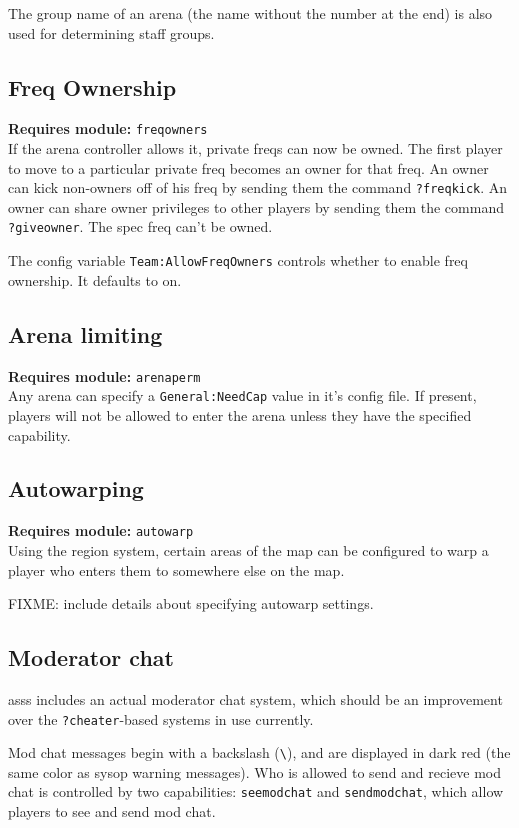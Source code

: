 \documentclass{article}
\newcommand{\asss}{asss}
\newcommand{\requiremod}[1]{\noindent\textbf{Requires module:} \texttt{#1}\\}
\begin{document}
The group name of an arena (the name without the number at the end) is
also used for determining staff groups.


\subsection{Freq Ownership}

\requiremod{freqowners}
If the arena controller allows it, private freqs can now be owned. The
first player to move to a particular private freq becomes an owner for
that freq. An owner can kick non-owners off of his freq by sending them
the command \verb/?freqkick/. An owner can share owner privileges to
other players by sending them the command \verb/?giveowner/. The spec
freq can't be owned.

The config variable \texttt{Team:AllowFreqOwners} controls whether to
enable freq ownership. It defaults to on.

\subsection{Arena limiting}

\requiremod{arenaperm}
Any arena can specify a \texttt{General:NeedCap} value in it's config
file. If present, players will not be allowed to enter the arena unless
they have the specified capability.


\subsection{Autowarping}

\requiremod{autowarp}
Using the region system, certain areas of the map can be configured to
warp a player who enters them to somewhere else on the map.

FIXME: include details about specifying autowarp settings.


\subsection{Moderator chat}

\asss{} includes an actual moderator chat system, which should be an
improvement over the \verb/?cheater/-based systems in use currently.

Mod chat messages begin with a backslash (\verb/\/), and are displayed
in dark red (the same color as sysop warning messages). Who is allowed
to send and recieve mod chat is controlled by two capabilities:
\texttt{seemodchat} and \texttt{sendmodchat}, which allow players to see
and send mod chat.
\end{document}
